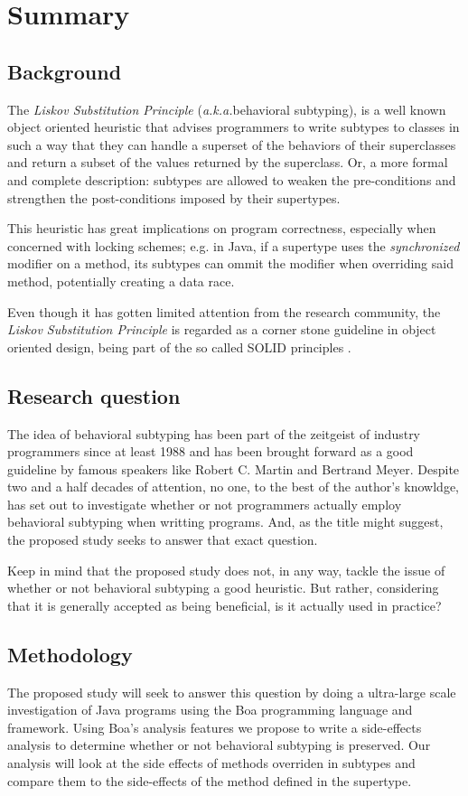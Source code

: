 \documentclass{acm_proc_article-sp}
\begin{document}
\section{Summary}
\subsection{Background}
The \emph{Liskov Substitution Principle} (\emph{a.k.a.}behavioral subtyping), is a well known \cite{martin2003agile} object oriented heuristic that advises programmers to write subtypes to classes in such a way that they can handle a superset of the behaviors of their superclasses and return a subset of the values returned by the superclass. Or, a more formal and complete description: subtypes are allowed to weaken the pre-conditions and strengthen the post-conditions imposed by their supertypes.

This heuristic has great implications on program correctness, especially when concerned with locking schemes; e.g. in Java, if a supertype uses the \emph{synchronized} modifier on a method, its subtypes can ommit the modifier when overriding said method, potentially creating a data race.

Even though it has gotten limited attention from the research community, the \emph{Liskov Substitution Principle} is regarded as a corner stone guideline in object oriented design, being part of the so called SOLID principles \cite{martin2000design}.

\subsection{Research question}
The idea of behavioral subtyping has been part of the zeitgeist of industry programmers since at least 1988\cite{meyer1988object} and has been brought forward as a good guideline by famous speakers like Robert C. Martin and Bertrand Meyer. Despite two and a half decades of attention, no one, to the best of the author's knowldge, has set out to investigate whether or not programmers actually employ behavioral subtyping when writting programs. And, as the title might suggest, the proposed study seeks to answer that exact question.

Keep in mind that the proposed study does not, in any way, tackle the issue of whether or not behavioral subtyping a good heuristic. But rather, considering that it is generally accepted as being beneficial, is it actually used in practice?

\subsection{Methodology}
The proposed study will seek to answer this question by doing a ultra-large scale investigation of Java programs using the Boa programming language and framework\cite{dyer2013boa:icse}. Using Boa's analysis features \cite{dyer2013boa:gpce} we propose to write a side-effects analysis to determine whether or not behavioral subtyping is preserved. Our analysis will look at the side effects of methods overriden in subtypes and compare them to the side-effects of the method defined in the supertype.
\end{document}
